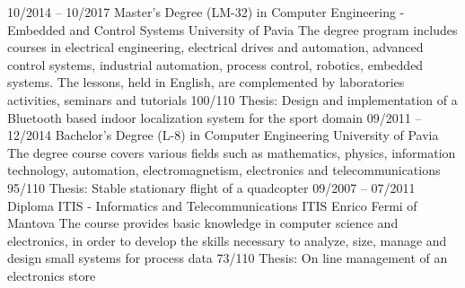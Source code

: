 \documentclass[9pt]{developercv} %
\begin{document}
\begin{entrylist}
	\entry
		{10/2014 -- 10/2017}
		{Master's Degree (LM-32) in Computer Engineering - Embedded and Control Systems}
		{University of Pavia}
		{The degree program includes courses in electrical engineering, electrical drives and automation, advanced control systems, industrial automation, process control, robotics, embedded systems. The lessons, held in English, are complemented by laboratories activities, seminars and tutorials}
		{100/110}
		{Thesis: Design and implementation of a Bluetooth based indoor localization system for the sport domain}
	\entry
		{09/2011 -- 12/2014}
		{Bachelor’s Degree (L-8) in Computer Engineering}
		{University of Pavia}
		{The degree course covers various fields such as mathematics, physics, information technology, automation, electromagnetism, electronics and telecommunications}
		{95/110}
		{Thesis: Stable stationary flight of a quadcopter}
	\entry
		{09/2007 -- 07/2011}
		{Diploma ITIS - Informatics and Telecommunications}
		{ITIS Enrico Fermi of Mantova}
		{The course provides basic knowledge in computer science and electronics, in order to develop the skills necessary to analyze, size, manage and design small systems for process data}
		{73/110}
		{Thesis: On line management of an electronics store}
\end{entrylist}


\end{document}
